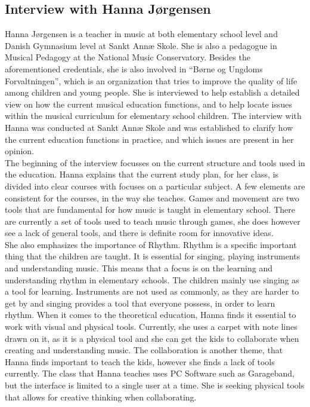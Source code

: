 \subsection{Interview with Hanna Jørgensen}
Hanna Jørgensen is a teacher in music at both elementary school level and Danish Gymnasium level at Sankt Annæ Skole. She is also a pedagogue in Musical Pedagogy at the National Music Conservatory. Besides the aforementioned credentials, she is also involved in “Børne og Ungdoms Forvaltningen”, which is an organization that tries to improve the quality of life among children and young people. She is interviewed to help establish a detailed view on how the current musical education functions, and to help locate issues within the musical curriculum for elementary school children.
The interview with Hanna was conducted at Sankt Annæ Skole and was established to clarify how the current education functions in practice, and which issues are present in her opinion.\\

The beginning of the interview focusses on the current structure and tools used in the education. Hanna explains that the current study plan, for her class, is divided into clear courses with focuses on a particular subject. A few elements are consistent for the courses, in the way she teaches. Games and movement are two tools that are fundamental for how music is taught in elementary school. There are currently a set of tools used to teach music through games, she does however see a lack of general tools, and there is definite room for innovative ideas.\\

She also emphasizes the importance of Rhythm. Rhythm is a specific important thing that the children are taught. It is essential for singing, playing instruments and understanding music. This means that a focus is on the learning and understanding rhythm in elementary schools. The children mainly use singing as a tool for learning. Instruments are not used as commonly, as they are harder to get by and singing provides a tool that everyone possess, in order to learn rhythm. When it comes to the theoretical education, Hanna finds it essential to work with visual and physical tools. Currently, she uses a carpet with note lines drawn on it, as it is a physical tool and she can get the kids to collaborate when creating and understanding music. The collaboration is another theme, that Hanna finds important to teach the kids, however she finds a lack of tools currently. The class that Hanna teaches uses PC Software such as Garageband, but the interface is limited to a single user at a time. She is seeking physical tools that allows for creative thinking when collaborating. \\

